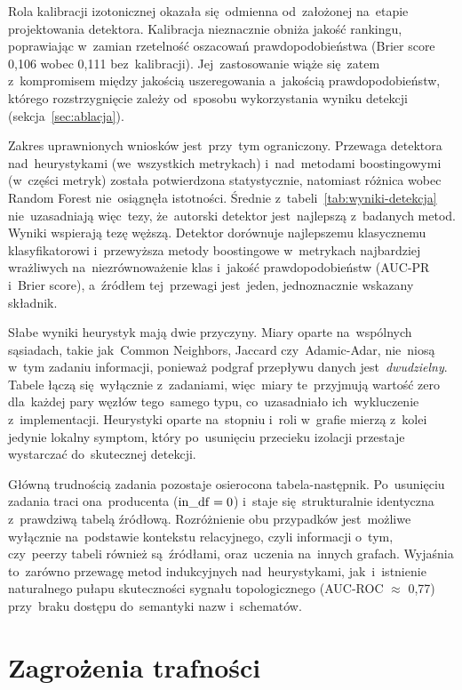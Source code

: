 \documentclass[polish,master,a4paper,oneside]{ppfcmthesis}
\renewcommand{\_}{\origtextunderscore\ifmmode\else\allowbreak\fi}
\begin{document}
Rola kalibracji izotonicznej okazała się~odmienna od~założonej na~etapie
projektowania detektora. Kalibracja nieznacznie obniża jakość rankingu,
poprawiając w~zamian rzetelność oszacowań prawdopodobieństwa (Brier score
0{,}106 wobec 0{,}111 bez~kalibracji). Jej~zastosowanie wiąże się~zatem
z~kompromisem między jakością uszeregowania a~jakością prawdopodobieństw,
którego rozstrzygnięcie zależy od~sposobu wykorzystania wyniku detekcji
(sekcja~\ref{sec:ablacja}).

Zakres uprawnionych wniosków jest~przy~tym ograniczony. Przewaga detektora
nad~heurystykami (we~wszystkich metrykach) i~nad~metodami boostingowymi
(w~części metryk) została potwierdzona statystycznie,
natomiast różnica wobec Random Forest nie~osiągnęła istotności. Średnie
z~tabeli~\ref{tab:wyniki-detekcja} nie~uzasadniają więc~tezy, że~autorski
detektor jest~najlepszą z~badanych metod. Wyniki wspierają tezę węższą.
Detektor dorównuje najlepszemu klasycznemu klasyfikatorowi i~przewyższa metody
boostingowe w~metrykach najbardziej wrażliwych na~niezrównoważenie klas
i~jakość prawdopodobieństw (AUC-PR i~Brier score), a~źródłem tej~przewagi
jest~jeden, jednoznacznie wskazany składnik.

Słabe wyniki heurystyk mają dwie przyczyny. Miary oparte na~wspólnych sąsiadach,
takie jak~Common Neighbors, Jaccard czy~Adamic-Adar, nie~niosą w~tym zadaniu
informacji, ponieważ podgraf przepływu danych jest~\emph{dwudzielny}. Tabele
łączą się~wyłącznie z~zadaniami, więc~miary te~przyjmują wartość zero dla~każdej
pary węzłów tego~samego typu, co~uzasadniało ich~wykluczenie z~implementacji.
Heurystyki oparte na~stopniu i~roli w~grafie mierzą z~kolei jedynie lokalny
symptom, który po~usunięciu przecieku izolacji przestaje wystarczać
do~skutecznej detekcji.

Główną trudnością zadania pozostaje osierocona tabela-następnik. Po~usunięciu
zadania traci ona~producenta ($\mathrm{in\_df} = 0$) i~staje się~strukturalnie
identyczna z~prawdziwą tabelą źródłową. Rozróżnienie obu przypadków jest~możliwe
wyłącznie na~podstawie kontekstu relacyjnego, czyli informacji o~tym, czy~peerzy
tabeli również są~źródłami, oraz~uczenia na~innych grafach. Wyjaśnia to~zarówno
przewagę metod indukcyjnych nad~heurystykami, jak~i~istnienie naturalnego
pułapu skuteczności sygnału topologicznego (AUC-ROC $\approx$ 0{,}77) przy~braku
dostępu do~semantyki nazw i~schematów.

\section{Zagrożenia trafności}
\label{sec:trafnosc}
\end{document}
